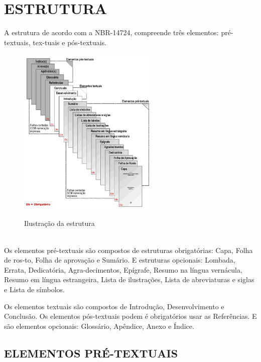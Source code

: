 %
%

\chapter{ESTRUTURA}

A estrutura de acordo com a NBR-14724, compreende três elementos: pré-textuais, tex-tuais e pós-textuais.

\begin{figure}[H]
	\vspace*{0,2cm}
    \centering
    \caption{Ilustração da estrutura}
    \includegraphics[width=0.6\textwidth]{./04-figuras/abnt}
    \label{fig:ilustfig2}
\end{figure}
\vspace*{-0,9cm}
{\raggedright {}}\\

Os elementos pré-textuais são compostos de estruturas
obrigatórias: Capa, Folha de ros-to, Folha de aprovação e Sumário. E estruturas opcionais: Lombada, Errata, Dedicatória, Agra-decimentos, Epígrafe, Resumo na língua vernácula, Resumo em língua estrangeira, Lista de ilustrações, Lista de abreviaturas e siglas e Lista de símbolos.

Os elementos textuais são compostos de Introdução,
Desenvolvimento e Conclusão. Os elementos pós-textuais podem é obrigatórios usar as Referências.  E são elementos opcionais: Glossário, Apêndice, Anexo e Índice.

\section{ELEMENTOS PRÉ-TEXTUAIS}

